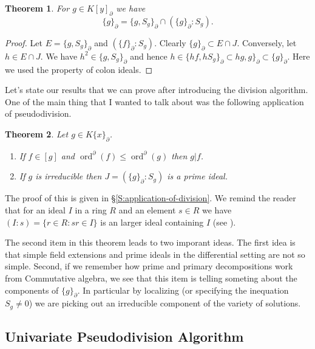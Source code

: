 \documentclass[12pt]{book}
\numberwithin{equation}{section}
\newtheorem{theorem}{Theorem}[subsection]
\theoremstyle{definition}
\theoremstyle{remark}
\newcommand{\ord}{\operatorname{ord}}
\begin{document}
\begin{theorem}
	For $g \in K[ y ]_{\partial}$ we have 
	 $$ \lbrace g \rbrace_{\partial} = \lbrace g, S_g \rbrace_{\partial} \cap ( \lbrace g \rbrace_{\partial} \colon S_g).$$
\end{theorem}
\begin{proof}
	Let $E= \lbrace g,S_g \rbrace_{\partial}$ and $( \lbrace f \rbrace_{\partial} \colon S_g)$. 
	Clearly $\lbrace g \rbrace_{\partial} \subset E \cap J$.
	Conversely, let $h \in E \cap J$. 
	We have $h^2 \in \lbrace g, S_g \rbrace_{\partial}$ and hence $h \in \lbrace hf, h S_g\rbrace_{\partial} \subset hg,g\rbrace_{\partial} \subset \lbrace g \rbrace_{\partial}$. 
	Here we used the property of colon ideals. 
\end{proof}

Let's state our results that we can prove after introducing the division algorithm.
One of the main thing that I wanted to talk about was the following application of pseudodivision. 
\begin{theorem}
	Let $g \in K \lbrace x \rbrace_{\partial}$. 
	\begin{enumerate}[topsep=0pt]
		\item If $f \in [g]$ and $\ord^{\partial}(f) \leq \ord^{\partial}(g)$ then $g \vert f$. 
		\item If $g$ is irreducible then $J = ( \lbrace g \rbrace_{\partial} : S_g)$ is a prime ideal. 
	\end{enumerate}
\end{theorem}
The proof of this is given in \S\ref{S:application-of-division}.
We remind the reader that for an ideal $I$ in a ring $R$ and an element $s\in R$ we have $(I:s) = \lbrace r \in R \colon sr \in I\rbrace$ is an larger ideal containing $I$ (see \cite{Atiyah2016}).


The second item in this theorem leads to two imporant ideas. 
The first idea is that simple field extensions and prime ideals in the differential setting are not so simple. 
Second, if we remember how prime and primary decompositions work from Commutative algebra, we see that this item is telling someting about the components of $\lbrace g\rbrace_{\partial}$.
In particular by localizing (or specifying the inequation $S_g\neq 0$) we are picking out an irreducible component of the variety of solutions.

\subsection{Univariate Pseudodivision Algorithm}
\end{document}

